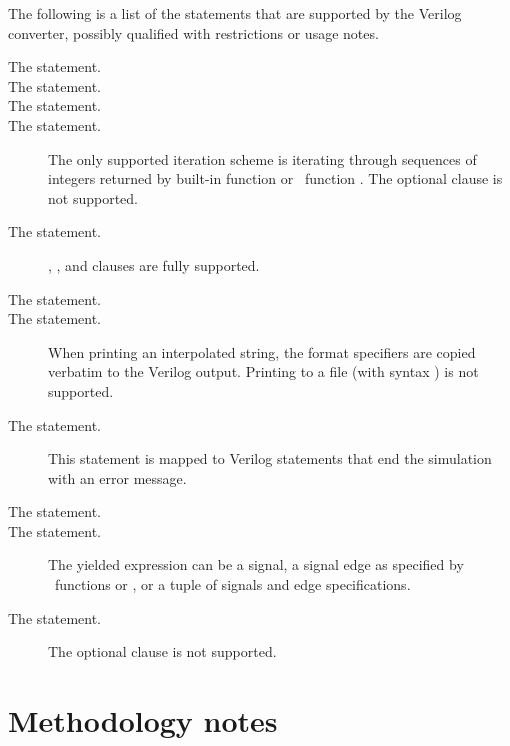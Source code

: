 The following is a list of the statements that are supported by the
Verilog converter, possibly qualified with restrictions
or usage notes. 

\begin{description}

\item[The  statement.]

\item[The  statement.]

\item[The  statement.]

\item[The  statement.]
The only supported iteration scheme is iterating through sequences of
integers returned by built-in function  or \myhdl\
function .  The optional  clause is
not supported.

\item[The  statement.]
\keyword{if}, , and  clauses
are fully supported.

\item[The  statement.]

\item[The  statement.]
When printing an interpolated string, the format specifiers are copied
verbatim to the Verilog output.  Printing to a file (with syntax
\code{'>>'}) is not supported.

\item[The  statement.]
This statement is mapped to Verilog statements
that end the simulation with an error message.

\item[The  statement.]

\item[The  statement.] 
The yielded expression can be a signal, a signal edge
as specified by \myhdl\ functions 
or , or a tuple of signals and
edge specifications.

\item[The  statement.]
The optional 
clause is not supported.

\end{description}

\section{Methodology notes\label{conv-meth}}

